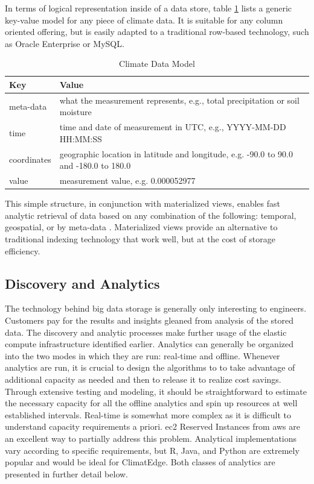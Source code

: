 In terms of logical representation inside of a data store, table \ref{model} lists a generic key-value model for any piece of climate data. It is suitable for any column oriented offering, but is easily adapted to a traditional row-based technology, such as Oracle Enterprise or MySQL.
\begin{table}[htbp]
    \centering
    \begin{tabular}{l l}
        \hline
	Key & Value \\ [0.5ex]
	\hline
	meta-data & what the measurement represents, e.g., total precipitation or soil moisture\\
	time & time and date of measurement in UTC, e.g., YYYY-MM-DD HH:MM:SS\\
	coordinates & geographic location in latitude and longitude, e.g. -90.0 to 90.0 and -180.0 to 180.0\\
	value & measurement value, e.g. 0.000052977\\
	\hline
    \end{tabular}
    \caption{Climate Data Model}
    \label{model}
\end{table}
This simple structure, in conjunction with materialized views, enables fast analytic retrieval of data based on any combination of the following: temporal, geospatial, or by meta-data \cite{materialized_views}. Materialized views provide an alternative to traditional indexing technology that work well, but at the cost of storage efficiency. 
\subsection{Discovery and Analytics}
The technology behind big data storage is generally only interesting to engineers. Customers pay for the results and insights gleaned from analysis of the stored data. The discovery and analytic processes make further usage of the elastic compute infrastructure identified earlier. Analytics can generally be organized into the two modes in which they are run: real-time and offline. Whenever analytics are run, it is crucial to design the algorithms to to take advantage of additional capacity as needed and then to release it to realize cost savings. Through extensive testing and modeling, it should be straightforward to estimate the necessary capacity for all the offline analytics and spin up resources at well established intervals. Real-time is somewhat more complex as it is difficult to understand capacity requirements a priori. \gls{ec2} Reserved Instances from \gls{aws} are an excellent way to partially address this problem. Analytical implementations vary according to specific requirements, but R, Java, and Python are extremely popular and would be ideal for ClimatEdge. Both classes of analytics are presented in further detail below.
